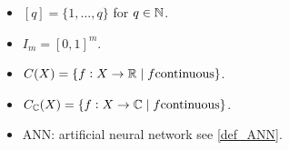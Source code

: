 



\begin{itemize}
	\item $[q] = \{1,\dots,q\}$ for $q\in \mathbb{N}$.
	\item $I_m = [0,1]^m$.
	\item $C(X) = \{ f : X \to \mathbb{R} \mid f \text{continuous} \}$.
	\item $C_\mathbb{C}(X) = \{ f : X \to \mathbb{C} \mid f \text{continuous} \}$.
	\item ANN: artificial neural network see \cref{def_ANN}.
\end{itemize}
